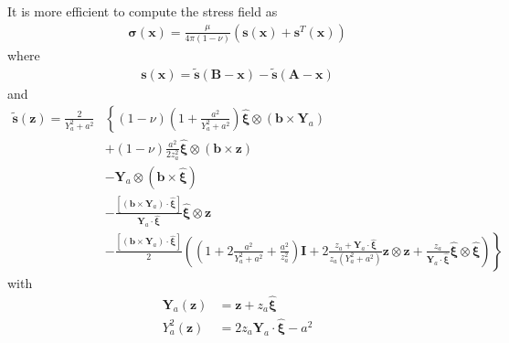 \documentclass[10pt]{report}
\begin{document}
{%
It is more efficient to compute the stress field as
\begin{align}
\bm\sigma(\bm x)=\frac{\mu}{4\pi(1-\nu)}\left(\bm s(\bm x)+\bm s^T(\bm x)\right)
\end{align}
where
\begin{align}
\bm s(\bm x)=\tilde {\bm s}(\bm B-\bm x)-\tilde {\bm s}(\bm A-\bm x)
\end{align}
and
\begin{align}
\tilde{\bm s}(\bm z)
=\frac{2}{Y_a^2+a^2}&
\left\{
(1-\nu)\left(1+\frac{a^2}{Y_a^2+a^2}\right)\hat{\bm\xi}\otimes\left(\bm b\times \bm Y_a\right)\right.\nonumber\\
&+(1-\nu)\frac{a^2}{2z_a^2 }\hat{\bm\xi}\otimes\left(\bm b\times \bm z\right)\nonumber\\
&-\bm Y_a\otimes\left(\bm b\times\hat{\bm \xi}\right)\nonumber\\
&-\frac{\left[\left(\bm b\times\bm Y_a\right)\cdot\hat{\bm \xi}\right]}{\bm Y_a\cdot \hat{\bm \xi}}\hat{\bm\xi}\otimes\bm z\nonumber\\
&\left.-\frac{\left[\left(\bm b\times\bm Y_a\right)\cdot\hat{\bm \xi}\right]}{2}\left(\left(1+2\frac{a^2}{Y_a^2+a^2}+\frac{a^2}{z_a^2 }\right)\bm I+2\frac{z_a+\bm Y_a\cdot \hat{\bm \xi}}{z_a(Y_a^2+a^2)}\bm z\otimes\bm z+\frac{z_a}{\bm Y_a\cdot \hat{\bm \xi}}\hat{\bm\xi}\otimes\hat{\bm\xi}\right)\right\}%
\end{align}
with
\begin{align}
\bm Y_a(\bm z)&=\bm z+z_a\hat{\bm\xi}\\
 Y^2_a(\bm z)&=2z_a\bm Y_a\cdot\hat{\bm \xi}-a^2\\
\end{align}

}
\end{document}
